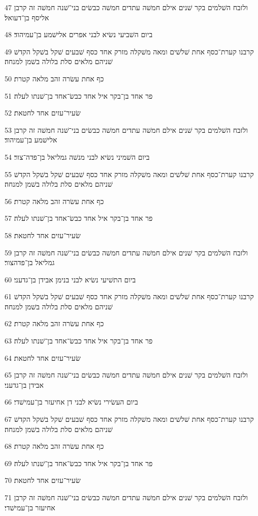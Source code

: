 \par 47 ולזבח השׁלמים בקר שׁנים אילם חמשׁה עתדים חמשׁה כבשׂים בני־שׁנה חמשׁה זה קרבן אליסף בן־דעואל׃
\par 48 ביום השׁביעי נשׂיא לבני אפרים אלישׁמע בן־עמיהוד׃
\par 49 קרבנו קערת־כסף אחת שׁלשׁים ומאה משׁקלה מזרק אחד כסף שׁבעים שׁקל בשׁקל הקדשׁ שׁניהם מלאים סלת בלולה בשׁמן למנחה׃
\par 50 כף אחת עשׂרה זהב מלאה קטרת׃
\par 51 פר אחד בן־בקר איל אחד כבשׂ־אחד בן־שׁנתו לעלה׃
\par 52 שׂעיר־עזים אחד לחטאת׃
\par 53 ולזבח השׁלמים בקר שׁנים אילם חמשׁה עתדים חמשׁה כבשׂים בני־שׁנה חמשׁה זה קרבן אלישׁמע בן־עמיהוד׃
\par 54 ביום השׁמיני נשׂיא לבני מנשׁה גמליאל בן־פדה־צור׃
\par 55 קרבנו קערת־כסף אחת שׁלשׁים ומאה משׁקלה מזרק אחד כסף שׁבעים שׁקל בשׁקל הקדשׁ שׁניהם מלאים סלת בלולה בשׁמן למנחה׃
\par 56 כף אחת עשׂרה זהב מלאה קטרת׃
\par 57 פר אחד בן־בקר איל אחד כבשׂ־אחד בן־שׁנתו לעלה׃
\par 58 שׂעיר־עזים אחד לחטאת׃
\par 59 ולזבח השׁלמים בקר שׁנים אילם חמשׁה עתדים חמשׁה כבשׂים בני־שׁנה חמשׁה זה קרבן גמליאל בן־פדהצור׃
\par 60 ביום התשׁיעי נשׂיא לבני בנימן אבידן בן־גדעני׃
\par 61 קרבנו קערת־כסף אחת שׁלשׁים ומאה משׁקלה מזרק אחד כסף שׁבעים שׁקל בשׁקל הקדשׁ שׁניהם מלאים סלת בלולה בשׁמן למנחה׃
\par 62 כף אחת עשׂרה זהב מלאה קטרת׃
\par 63 פר אחד בן־בקר איל אחד כבשׂ־אחד בן־שׁנתו לעלה׃
\par 64 שׂעיר־עזים אחד לחטאת׃
\par 65 ולזבח השׁלמים בקר שׁנים אילם חמשׁה עתדים חמשׁה כבשׂים בני־שׁנה חמשׁה זה קרבן אבידן בן־גדעני׃
\par 66 ביום העשׂירי נשׂיא לבני דן אחיעזר בן־עמישׁדי׃
\par 67 קרבנו קערת־כסף אחת שׁלשׁים ומאה משׁקלה מזרק אחד כסף שׁבעים שׁקל בשׁקל הקדשׁ שׁניהם מלאים סלת בלולה בשׁמן למנחה׃
\par 68 כף אחת עשׂרה זהב מלאה קטרת׃
\par 69 פר אחד בן־בקר איל אחד כבשׂ־אחד בן־שׁנתו לעלה׃
\par 70 שׂעיר־עזים אחד לחטאת׃
\par 71 ולזבח השׁלמים בקר שׁנים אילם חמשׁה עתדים חמשׁה כבשׂים בני־שׁנה חמשׁה זה קרבן אחיעזר בן־עמישׁדי׃
